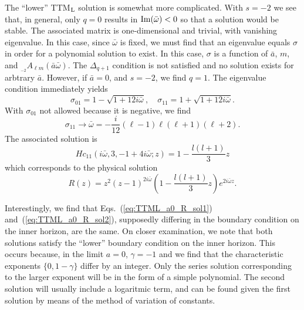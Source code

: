 \documentclass[11pt]{article}
\newcommand{\scA}[4][]{{}_{{}_{#2}}A^{#1}_{#3}(#4)}
\begin{document}
The ``lower'' TTM${}_{\rm{L}}$ solution is somewhat more complicated.
With $s=-2$ we see that, in general, only $q=0$ results in
$\rm{Im}(\bar\omega)<0$ so that a solution would be stable.  The
associated matrix is one-dimensional and trivial, with vanishing
eigenvalue.  In this case, since $\bar\omega$ is fixed, we must find
that an eigenvalue equals $\sigma$ in order for a polynomial solution
to exist.  In this case, $\sigma$ is a function of $\bar{a}$, $m$, and
$\scA{-2}{\ell{m}}{\bar{a}\bar\omega}$.  The $\Delta_{q+1}$ condition
is not satisfied and no solution exists for arbtrary $\bar{a}$.  However,
if $\bar{a}=0$, and $s=-2$, we find $q=1$.  The eigenvalue condition
immediately yields
\begin{equation}
\sigma_{01}=1-\sqrt{1+12i\bar\omega},\quad
\sigma_{11}=1+\sqrt{1+12i\bar\omega}.
\end{equation}
With $\sigma_{01}$ not allowed because it is negative, we find
\begin{equation}
   \sigma_{11}\to\bar\omega =-\frac{i}{12}(\ell-1)\ell(\ell+1)(\ell+2).
\end{equation}
The associated solution is
\begin{equation}\label{eq:TTML_a0_H_sol2}
  Hc_{11}(i\bar\omega,3,-1+4i\bar\omega;z) = 1-\frac{l(l+1)}3z
\end{equation}
which corresponds to the physical solution
\begin{equation}\label{eq:TTML_a0_R_sol2}
  R(z) = z^2(z-1)^{2i\bar\omega}\left(1-\frac{l(l+1)}3z\right)e^{2i\bar\omega z}.
\end{equation}

Interestingly, we find that Eqs.~(\ref{eq:TTML_a0_R_sol1})
and~(\ref{eq:TTML_a0_R_sol2}), supposedly differing in the boundary
condition on the inner horizon, are the same.  On closer examination,
we note that both solutions satisfy the ``lower'' boundary condition
on the inner horizon.  This occurs because, in the limit $a=0$,
$\gamma=-1$ and we find that the characteristic exponents
$\{0,1-\gamma\}$ differ by an integer.  Only the series solution
  corresponding to the larger exponent will be in the form of a simple
  polynomial.  The second solution will usually include a logaritmic term,
  and can be found given the first solution by means of the method of 
variation of constants.
\end{document}
